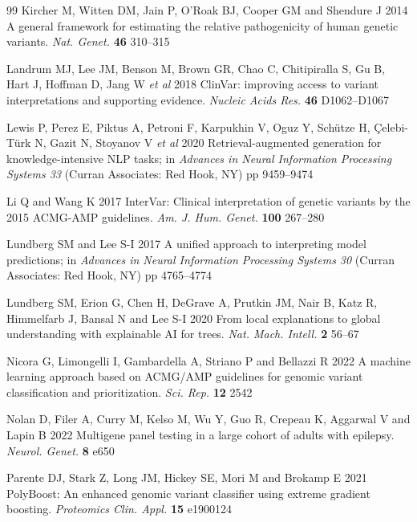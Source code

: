 \documentclass[12pt,a4paper]{article}
\begin{document}
\begin{thebibliography}{99}
Kircher M, Witten DM, Jain P, O'Roak BJ, Cooper GM and
Shendure J 2014 A general framework for estimating the relative
pathogenicity of human genetic variants.
\textit{Nat. Genet.} \textbf{46} 310--315

Landrum MJ, Lee JM, Benson M, Brown GR, Chao C, Chitipiralla S,
Gu B, Hart J, Hoffman D, Jang W \textit{et al} 2018 ClinVar:
improving access to variant interpretations and supporting evidence.
\textit{Nucleic Acids Res.} \textbf{46} D1062--D1067

Lewis P, Perez E, Piktus A, Petroni F, Karpukhin V, Oguz Y,
Sch\"{u}tze H, \c{C}elebi-T\"{u}rk N, Gazit N, Stoyanov V
\textit{et al} 2020 Retrieval-augmented generation for
knowledge-intensive NLP tasks; in \textit{Advances in Neural
Information Processing Systems 33} (Curran Associates: Red Hook, NY)
pp 9459--9474

Li Q and Wang K 2017 InterVar: Clinical interpretation of genetic
variants by the 2015 ACMG-AMP guidelines.
\textit{Am. J. Hum. Genet.} \textbf{100} 267--280

Lundberg SM and Lee S-I 2017 A unified approach to interpreting
model predictions; in \textit{Advances in Neural Information
Processing Systems 30} (Curran Associates: Red Hook, NY) pp
4765--4774

Lundberg SM, Erion G, Chen H, DeGrave A, Prutkin JM, Nair B,
Katz R, Himmelfarb J, Bansal N and Lee S-I 2020 From local
explanations to global understanding with explainable AI for trees.
\textit{Nat. Mach. Intell.} \textbf{2} 56--67

Nicora G, Limongelli I, Gambardella A, Striano P and Bellazzi R
2022 A machine learning approach based on ACMG/AMP guidelines for
genomic variant classification and prioritization.
\textit{Sci. Rep.} \textbf{12} 2542

Nolan D, Filer A, Curry M, Kelso M, Wu Y, Guo R, Crepeau K,
Aggarwal V and Lapin B 2022 Multigene panel testing in a large
cohort of adults with epilepsy.
\textit{Neurol. Genet.} \textbf{8} e650

Parente DJ, Stark Z, Long JM, Hickey SE, Mori M and Brokamp E 2021
PolyBoost: An enhanced genomic variant classifier using extreme
gradient boosting.
\textit{Proteomics Clin. Appl.} \textbf{15} e1900124


\end{thebibliography}
\end{document}
